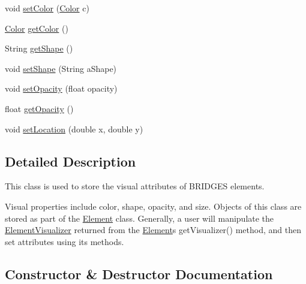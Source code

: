 \begin{DoxyCompactItemize}
\item 
void \hyperlink{classbridges_1_1base_1_1_element_visualizer_a33172ab908f3b6f9740727b0bfe91565}{set\+Color} (\hyperlink{classbridges_1_1base_1_1_color}{Color} c)
\item 
\hyperlink{classbridges_1_1base_1_1_color}{Color} \hyperlink{classbridges_1_1base_1_1_element_visualizer_a3bf821b9bfa02746882bac934ce4fb8e}{get\+Color} ()
\item 
String \hyperlink{classbridges_1_1base_1_1_element_visualizer_a8ef0825745e49f32b57e4bf6c891b57e}{get\+Shape} ()
\item 
void \hyperlink{classbridges_1_1base_1_1_element_visualizer_ac3bad991904c8ad23e5233b341381d93}{set\+Shape} (String a\+Shape)
\item 
void \hyperlink{classbridges_1_1base_1_1_element_visualizer_a932f62eb1bd0c92da265a7f903dd0790}{set\+Opacity} (float opacity)
\item 
float \hyperlink{classbridges_1_1base_1_1_element_visualizer_ab86ff39f17f8d1766670b18be88b5492}{get\+Opacity} ()
\item 
void \hyperlink{classbridges_1_1base_1_1_element_visualizer_a04f3416447f2042de7cd21ce5b6a0598}{set\+Location} (double x, double y)
\end{DoxyCompactItemize}


\subsection{Detailed Description}
This class is used to store the visual attributes of B\+R\+I\+D\+G\+E\+S elements. 

Visual properties include color, shape, opacity, and size. Objects of this class are stored as part of the \hyperlink{classbridges_1_1base_1_1_element}{Element} class. Generally, a user will manipulate the \hyperlink{classbridges_1_1base_1_1_element_visualizer}{Element\+Visualizer} returned from the \hyperlink{classbridges_1_1base_1_1_element}{Element}\textquotesingle{}s get\+Visualizer() method, and then set attributes using its methods. 

\subsection{Constructor \& Destructor Documentation}
\hypertarget{classbridges_1_1base_1_1_element_visualizer_acbca874876ec1e8dbbde6484a4fc056e}{}
